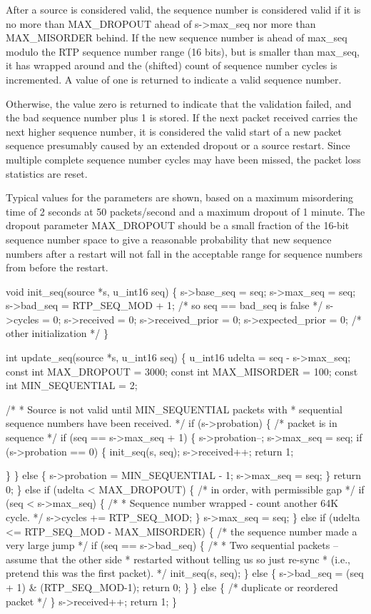 \documentclass{article}
\begin{document}
\begin{itemize}
After a source is considered valid, the sequence number is considered valid if it is no more than MAX\_DROPOUT ahead of s->max\_seq nor more than MAX\_MISORDER behind.  If the new sequence number is ahead of max\_seq modulo the RTP sequence number range (16 bits), but is smaller than max\_seq, it has wrapped around and the (shifted) count of sequence number cycles is incremented.  A value of one is returned to indicate a valid sequence number.

Otherwise, the value zero is returned to indicate that the validation failed, and the bad sequence number plus 1 is stored.  If the next packet received carries the next higher sequence number, it is considered the valid start of a new packet sequence presumably caused by an extended dropout or a source restart.  Since multiple complete sequence number cycles may have been missed, the packet loss statistics are reset.

Typical values for the parameters are shown, based on a maximum misordering time of 2 seconds at 50 packets/second and a maximum dropout of 1 minute.  The dropout parameter MAX\_DROPOUT should be a small fraction of the 16-bit sequence number space to give a reasonable probability that new sequence numbers after a restart will not fall in the acceptable range for sequence numbers from before the restart.

void init\_seq(source *s, u\_int16 seq) \{ s->base\_seq = seq; s->max\_seq = seq; s->bad\_seq = RTP\_SEQ\_MOD + 1;   /* so seq == bad\_seq is false */ s->cycles = 0; s->received = 0; s->received\_prior = 0; s->expected\_prior = 0; /* other initialization */ \}

int update\_seq(source *s, u\_int16 seq) \{ u\_int16 udelta = seq - s->max\_seq; const int MAX\_DROPOUT = 3000; const int MAX\_MISORDER = 100; const int MIN\_SEQUENTIAL = 2;

/* * Source is not valid until MIN\_SEQUENTIAL packets with * sequential sequence numbers have been received. */ if (s->probation) \{ /* packet is in sequence */ if (seq == s->max\_seq + 1) \{ s->probation--; s->max\_seq = seq; if (s->probation == 0) \{ init\_seq(s, seq); s->received++; return 1;

\} \} else \{ s->probation = MIN\_SEQUENTIAL - 1; s->max\_seq = seq; \} return 0; \} else if (udelta < MAX\_DROPOUT) \{ /* in order, with permissible gap */ if (seq < s->max\_seq) \{ /* * Sequence number wrapped - count another 64K cycle. */ s->cycles += RTP\_SEQ\_MOD; \} s->max\_seq = seq; \} else if (udelta <= RTP\_SEQ\_MOD - MAX\_MISORDER) \{ /* the sequence number made a very large jump */ if (seq == s->bad\_seq) \{ /* * Two sequential packets -- assume that the other side * restarted without telling us so just re-sync * (i.e., pretend this was the first packet). */ init\_seq(s, seq); \} else \{ s->bad\_seq = (seq + 1) \& (RTP\_SEQ\_MOD-1); return 0; \} \} else \{ /* duplicate or reordered packet */ \} s->received++; return 1; \}


\end{itemize}
\end{document}
